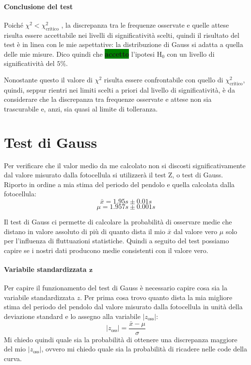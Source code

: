 \documentclass{article}
\begin{document}
	\paragraph{Conclusione del test} Poiché $\chi^2 < \chi^2_{\text{critico}}$ , la  discrepanza tra le frequenze osservate e quelle attese risulta essere accettabile nei livelli di significatività scelti, quindi il risultato del test è in linea con le mie aspettative: la distribuzione di Gauss si adatta a quella delle mie misure. Dico quindi che \colorbox{green}{\textbf{accetto}} l'ipotesi $\text{H}_{0}$ con un livello di significatività del $5\%$. 
	
	Nonostante questo il valore di $\chi^2$ risulta essere confrontabile con quello di $\chi^2_{\text{critico}}$, quindi, seppur rientri nei limiti scelti a priori dal livello di significatività, è da considerare che la discrepanza tra frequenze osservate e attese non sia trascurabile e, anzi, sia quasi al limite di tolleranza.
	
	
	\vspace{1cm}
	\section{Test di Gauss}
	Per verificare che il valor medio da me calcolato non si discosti significativamente dal valore misurato dalla fotocellula si utilizzerà il test Z, o test di Gauss. Riporto in ordine a mia stima del periodo del pendolo e quella calcolata dalla fotocellula:
	\[
	\bar{x} = 1.95s \pm 0.01 s
	\]
	\[
	\mu = 1.957s \pm 0.001 s
	\]

	Il test di Gauss ci permette di calcolare la probabilità di osservare medie che distano in valore assoluto di più di quanto dista il mio $\bar{x}$ dal valore vero $\mu$ solo per l'influenza di fluttuazioni statistiche. Quindi a seguito del test possiamo capire se i nostri dati producono medie consistenti con il valore vero.\\
	
		\paragraph{Variabile standardizzata $\mathbf{z}$} Per capire il funzionamento del test di Gauss è necessario capire cosa sia la variabile standardizzata $z$. Per prima cosa trovo quanto dista la mia migliore stima del periodo del pendolo dal valore misurato dalla fotocellula in  unità della deviazione standard e lo assegno alla variabile $|z_{\text{oss}}|$:
	\[
	|z_{\text{oss}}| = \frac{\bar{x} - \mu}{\sigma}
	\]
	Mi chiedo quindi quale sia la probabilità di ottenere una discrepanza maggiore del mio $|z_{\text{oss}}|$, ovvero mi chiedo quale sia la probabilità di ricadere nelle code della curva.
	
\end{document}
